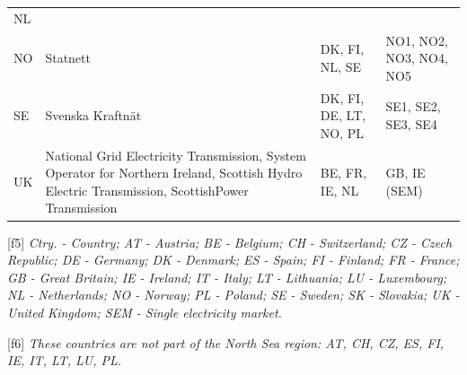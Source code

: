 \begin{longtable}[]{@{}llll@{}}
\begin{minipage}[t]{0.22\columnwidth}
NL\strut
\end{minipage}\tabularnewline
\begin{minipage}[t]{0.07\columnwidth}\raggedright
NO\strut
\end{minipage} & \begin{minipage}[t]{0.37\columnwidth}\raggedright
Statnett\strut
\end{minipage} & \begin{minipage}[t]{0.22\columnwidth}\raggedright
DK, FI, NL, SE\strut
\end{minipage} & \begin{minipage}[t]{0.22\columnwidth}\raggedright
NO1, NO2, NO3, NO4, NO5\strut
\end{minipage}\tabularnewline
\begin{minipage}[t]{0.07\columnwidth}\raggedright
SE\strut
\end{minipage} & \begin{minipage}[t]{0.37\columnwidth}\raggedright
Svenska Kraftnät\strut
\end{minipage} & \begin{minipage}[t]{0.22\columnwidth}\raggedright
DK, FI, DE, LT, NO, PL\strut
\end{minipage} & \begin{minipage}[t]{0.22\columnwidth}\raggedright
SE1, SE2, SE3, SE4\strut
\end{minipage}\tabularnewline
\begin{minipage}[t]{0.07\columnwidth}\raggedright
UK\strut
\end{minipage} & \begin{minipage}[t]{0.37\columnwidth}\raggedright
National Grid Electricity Transmission, System Operator for Northern
Ireland, Scottish Hydro Electric Transmission, ScottishPower
Transmission\strut
\end{minipage} & \begin{minipage}[t]{0.22\columnwidth}\raggedright
BE, FR, IE, NL\strut
\end{minipage} & \begin{minipage}[t]{0.22\columnwidth}\raggedright
GB, IE (SEM)\strut
\end{minipage}\tabularnewline
\bottomrule
\end{longtable}

{[}f5{]} \emph{Ctry. - Country; AT - Austria; BE - Belgium; CH -
Switzerland; CZ - Czech Republic; DE - Germany; DK - Denmark; ES -
Spain; FI - Finland; FR - France; GB - Great Britain; IE - Ireland; IT -
Italy; LT - Lithuania; LU - Luxembourg; NL - Netherlands; NO - Norway;
PL - Poland; SE - Sweden; SK - Slovakia; UK - United Kingdom; SEM -
Single electricity market.}

{[}f6{]} \emph{These countries are not part of the North Sea region: AT,
CH, CZ, ES, FI, IE, IT, LT, LU, PL.}
